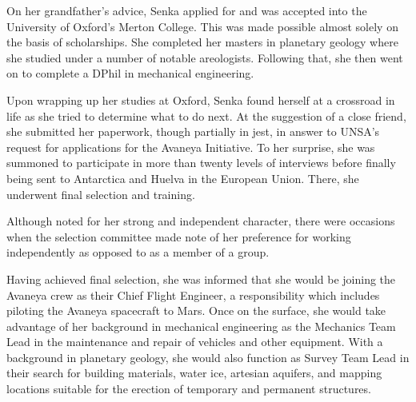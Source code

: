 On her grandfather's advice, Senka applied for and was accepted into the University of Oxford's Merton College. This was made possible almost solely on the basis of scholarships. She completed her masters in planetary geology where she studied under a number of notable areologists. Following that, she then went on to complete a DPhil in mechanical engineering.

Upon wrapping up her studies at Oxford, Senka found herself at a crossroad in life as she tried to determine what to do next. At the suggestion of a close friend, she submitted her paperwork, though partially in jest, in answer to UNSA's request for applications for the Avaneya Initiative. To her surprise, she was summoned to participate in more than twenty levels of interviews before finally being sent to Antarctica and Huelva in the European Union. There, she underwent final selection and training. 

Although noted for her strong and independent character, there were occasions when the selection committee made note of her preference for working independently as opposed to as a member of a group.

Having achieved final selection, she was informed that she would be joining the Avaneya crew as their Chief Flight Engineer, a responsibility which includes piloting the Avaneya spacecraft to Mars. Once on the surface, she would take advantage of her background in mechanical engineering as the Mechanics Team Lead in the maintenance and repair of vehicles and other equipment. With a background in planetary geology, she would also function as Survey Team Lead in their search for building materials, water ice, artesian aquifers, and mapping locations suitable for the erection of temporary and permanent structures.

